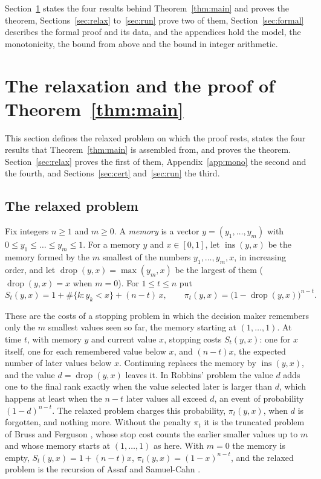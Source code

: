 \documentclass[11pt]{amsart}
\theoremstyle{definition}
\numberwithin{equation}{section}
\newcommand{\ins}{\operatorname{ins}}
\newcommand{\drop}{\operatorname{drop}}
\begin{document}
Section~\ref{sec:proof} states the four results behind Theorem~\ref{thm:main} and proves the theorem, Sections~\ref{sec:relax} to~\ref{sec:run} prove two of them, Section~\ref{sec:formal} describes the formal proof and its data, and the appendices hold the model, the monotonicity, the bound from above and the bound in integer arithmetic.

\section{The relaxation and the proof of Theorem~\ref{thm:main}}\label{sec:proof}

This section defines the relaxed problem on which the proof rests, states the four results that Theorem~\ref{thm:main} is assembled from, and proves the theorem. Section~\ref{sec:relax} proves the first of them, Appendix~\ref{app:mono} the second and the fourth, and Sections~\ref{sec:cert} and~\ref{sec:run} the third.

\subsection{The relaxed problem}
Fix integers $n\ge1$ and $m\ge0$. A \emph{memory} is a vector $y=(y_1,\dots,y_m)$ with $0\le y_1\le\dots\le y_m\le1$. For a memory $y$ and $x\in[0,1]$, let $\ins(y,x)$ be the memory formed by the $m$ smallest of the numbers $y_1,\dots,y_m,x$, in increasing order, and let $\drop(y,x)=\max(y_m,x)$ be the largest of them ($\drop(y,x)=x$ when $m=0$). For $1\le t\le n$ put
\begin{equation}\label{eq:relaxed}
S_t(y,x)=1+\#\{k: y_k<x\}+(n-t)\,x,\qquad \pi_t(y,x)=\bigl(1-\drop(y,x)\bigr)^{n-t}.
\end{equation}

These are the costs of a stopping problem in which the decision maker remembers only the $m$ smallest values seen so far, the memory starting at $(1,\dots,1)$. At time $t$, with memory $y$ and current value $x$, stopping costs $S_t(y,x)$: one for $x$ itself, one for each remembered value below $x$, and $(n-t)x$, the expected number of later values below $x$. Continuing replaces the memory by $\ins(y,x)$, and the value $d=\drop(y,x)$ leaves it. In Robbins' problem the value $d$ adds one to the final rank exactly when the value selected later is larger than $d$, which happens at least when the $n-t$ later values all exceed $d$, an event of probability $(1-d)^{n-t}$. The relaxed problem charges this probability, $\pi_t(y,x)$, when $d$ is forgotten, and nothing more. Without the penalty $\pi_t$ it is the truncated problem of Bruss and Ferguson \cite[(4.4) and (4.5)]{BF93}, whose stop cost counts the earlier smaller values up to $m$ and whose memory starts at $(1,\dots,1)$ as here. With $m=0$ the memory is empty, $S_t(y,x)=1+(n-t)x$, $\pi_t(y,x)=(1-x)^{n-t}$, and the relaxed problem is the recursion of Assaf and Samuel-Cahn \cite[(3.3)]{AS96}.
\end{document}
